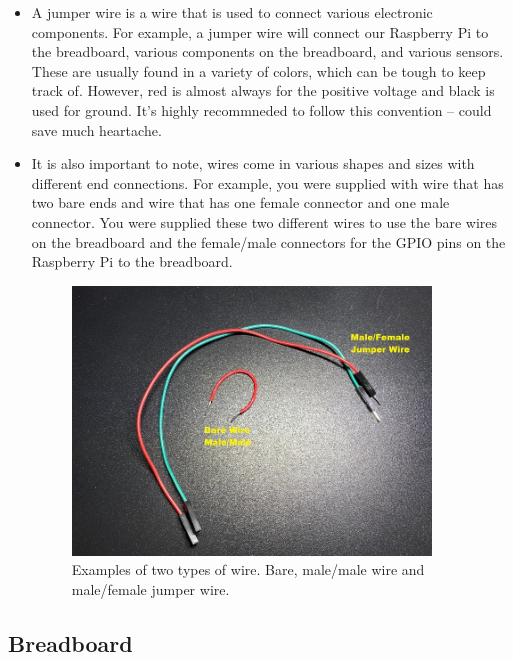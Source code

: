 \documentclass{article}\usepackage[]{graphicx}\usepackage[]{color}
\begin{document}
\begin{itemize}
\item A jumper wire is a wire that is used to connect various electronic components. For example, a jumper wire will connect our Raspberry Pi to the breadboard, various components on the breadboard, and various sensors. These are usually found in a variety of colors, which can be tough to keep track of. However, red is almost always for the positive voltage and black is used for ground. It's highly recommneded to follow this convention -- could save much heartache.
\item It is also important to note, wires come in various shapes and sizes with different end connections. For example, you were supplied with wire that has two bare ends and wire that has one female connector and one male connector. You were supplied these two different wires to use the bare wires on the breadboard and the female/male connectors for the GPIO pins on the Raspberry Pi to the breadboard.

\begin{figure}[h]
\begin{center}
\includegraphics[width=0.90\textwidth]{wires}
\caption{Examples of two types of wire. Bare, male/male wire and male/female jumper wire.\label{fig:wires}}
\end{center}
\end{figure}
\end{itemize}

\subsection{Breadboard}
\end{document}
